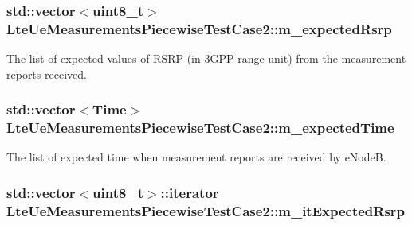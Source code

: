 \subsubsection[{\texorpdfstring{m\+\_\+expected\+Rsrp}{m_expectedRsrp}}]{\setlength{\rightskip}{0pt plus 5cm}std\+::vector$<$uint8\+\_\+t$>$ Lte\+Ue\+Measurements\+Piecewise\+Test\+Case2\+::m\+\_\+expected\+Rsrp\hspace{0.3cm}{\ttfamily [private]}}\hypertarget{classLteUeMeasurementsPiecewiseTestCase2_a657edc6c75b0ebc54cebca3ba7bb166f}{}\label{classLteUeMeasurementsPiecewiseTestCase2_a657edc6c75b0ebc54cebca3ba7bb166f}


The list of expected values of R\+S\+RP (in 3\+G\+PP range unit) from the measurement reports received. 

\subsubsection[{\texorpdfstring{m\+\_\+expected\+Time}{m_expectedTime}}]{\setlength{\rightskip}{0pt plus 5cm}std\+::vector$<${\bf Time}$>$ Lte\+Ue\+Measurements\+Piecewise\+Test\+Case2\+::m\+\_\+expected\+Time\hspace{0.3cm}{\ttfamily [private]}}\hypertarget{classLteUeMeasurementsPiecewiseTestCase2_affb68ca4f88019ca3b9aadbefe29d908}{}\label{classLteUeMeasurementsPiecewiseTestCase2_affb68ca4f88019ca3b9aadbefe29d908}


The list of expected time when measurement reports are received by e\+NodeB. 

\subsubsection[{\texorpdfstring{m\+\_\+it\+Expected\+Rsrp}{m_itExpectedRsrp}}]{\setlength{\rightskip}{0pt plus 5cm}std\+::vector$<$uint8\+\_\+t$>$\+::iterator Lte\+Ue\+Measurements\+Piecewise\+Test\+Case2\+::m\+\_\+it\+Expected\+Rsrp\hspace{0.3cm}{\ttfamily [private]}}\hypertarget{classLteUeMeasurementsPiecewiseTestCase2_adf38952334ae0b1372acdc5004420a01}{}\label{classLteUeMeasurementsPiecewiseTestCase2_adf38952334ae0b1372acdc5004420a01}


